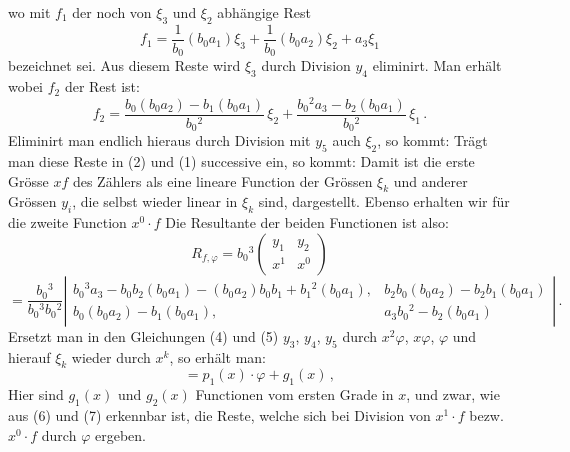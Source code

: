 wo mit $f_1$ der noch von $\xi_3$ und $\xi_2$ abhängige Rest
\[ f_1 = \frac{1}{b_0}(b_0a_1)\xi_3 + \frac{1}{b_0}(b_0a_2)\xi_2 + a_3\xi_1 \]
bezeichnet sei. Aus diesem Reste wird $\xi_3$ durch Division $y_4$ eliminirt. Man erhält
wobei $f_2$ der Rest ist:
\[ f_2 = \frac{b_0(b_0a_2) - b_1(b_0a_1)}{b_0{}^2}\,\xi_2 + \frac{b_0{}^2a_3 - b_2(b_0a_1)}{b_0{}^2}\,\xi_1\,. \]
Eliminirt man endlich hieraus durch Division mit $y_5$ auch $\xi_2$, so kommt:
Trägt man diese Reste in (2) und (1) successive ein, so kommt:
Damit ist die erste Grösse $xf$ des Zählers als eine lineare Function der Grössen $\xi_k$ und anderer Grössen $y_i$, die selbst wieder linear in $\xi_k$ sind, dargestellt. Ebenso erhalten wir für die zweite Function $x^0\cdot f$
Die Resultante der beiden Functionen ist also:
\[ R_{f,\varphi} = b_0{}^3 \begin{pmatrix} y_1 & y_2 \\ x^1 & x^0 \end{pmatrix} \]
\[ = \frac{b_0{}^3}{b_0{}^3b_0{}^2}\left|\begin{matrix}
b_0{}^3a_3-b_0b_2(b_0a_1)-(b_0a_2)b_0b_1+b_1{}^2(b_0a_1), & b_2b_0(b_0a_2)-b_2b_1(b_0a_1)\\[4pt]
b_0(b_0a_2)-b_1(b_0a_1), & a_3b_0{}^2-b_2(b_0a_1)
\end{matrix}\right|\,. \]
Ersetzt man in den Gleichungen (4) und (5) $y_3$, $y_4$, $y_5$ durch $x^2\varphi$, $x\varphi$, $\varphi$ und hierauf $\xi_k$ wieder durch $x^k$, so erhält man:
\[ = p_1(x)\cdot\varphi + g_1(x)\,, \]
Hier sind $g_1(x)$ und $g_2(x)$ Functionen vom ersten Grade in $x$, und zwar, wie aus (6) und (7) erkennbar ist, die Reste, welche sich bei Division von $x^1\cdot f$ bezw. $x^0\cdot f$ durch $\varphi$ ergeben.


